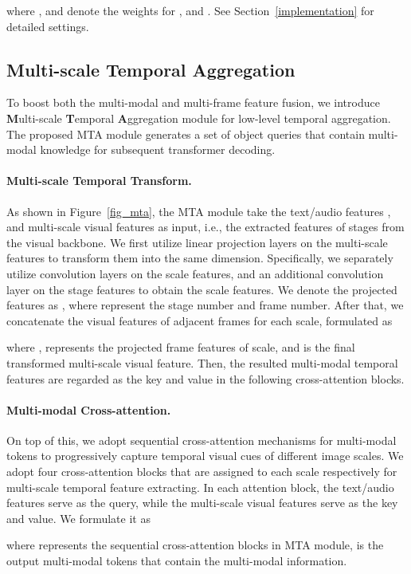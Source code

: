 \documentclass{article}
\begin{document}
where ,  and  denote the weights for ,  and . See Section~\ref{implementation} for detailed settings.

\subsection{Multi-scale Temporal Aggregation}
\label{mta}
To boost both the multi-modal and multi-frame feature fusion, we introduce \textbf{M}ulti-scale \textbf{T}emporal \textbf{A}ggregation module for low-level temporal aggregation. The proposed MTA module generates a set of object queries that contain multi-modal knowledge for subsequent transformer decoding.

\paragraph{Multi-scale Temporal Transform.}
As shown in Figure~\ref{fig_mta}, the MTA module take the text/audio features , and multi-scale visual features as input, i.e., the extracted features of  stages from the visual backbone. We first utilize linear projection layers on the multi-scale features to transform them into the same dimension. Specifically, we separately utilize  convolution layers on the  scale features, and an additional  convolution layer on the  stage features to obtain the  scale features. We denote the projected features as , where  represent the stage number and frame number. After that, we concatenate the visual features of adjacent frames for each scale, formulated as
 
where ,  represents the projected  frame features of  scale, and  is the final transformed multi-scale visual feature. 
Then, the resulted multi-modal temporal features are regarded as the key and value in the following cross-attention blocks.

\paragraph{Multi-modal Cross-attention.}
On top of this, we adopt sequential cross-attention mechanisms for multi-modal tokens to progressively capture temporal visual cues of different image scales. 
We adopt four cross-attention blocks that are assigned to each scale respectively for multi-scale temporal feature extracting.
In each attention block, the text/audio features serve as the query, while the multi-scale visual features serve as the key and value. We formulate it as

where  represents the sequential cross-attention blocks in MTA module,  is the output multi-modal tokens that contain the multi-modal information. 
\end{document}
